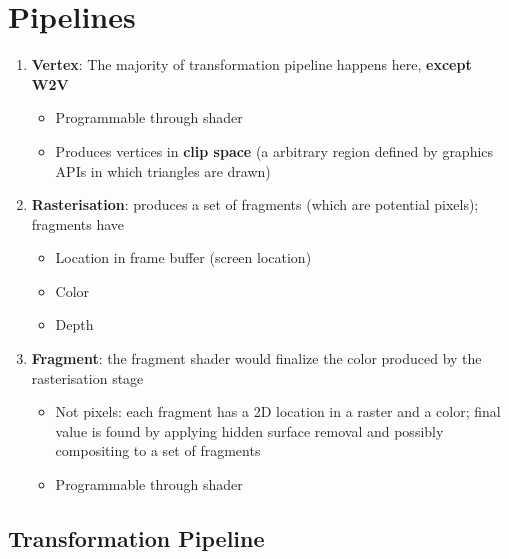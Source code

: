 \chapter{Pipelines}\label{chapter: pipelines}

\begin{enumerate}
  \item \textbf{Vertex}: The majority of transformation pipeline happens here,
  \textbf{except W2V}
  \begin{itemize}
    \item Programmable through shader
    \item Produces vertices in \textbf{clip space} (a arbitrary region defined
    by graphics APIs in which triangles are drawn)
  \end{itemize}

  \item \textbf{Rasterisation}: produces a set of fragments (which are
  potential pixels); fragments have
  \begin{itemize}
    \item Location in frame buffer (screen location)
    \item Color
    \item Depth
  \end{itemize}

  \item \textbf{Fragment}: the fragment shader would finalize the color
  produced by the rasterisation stage
  \begin{itemize}
    \item Not pixels: each fragment has a 2D location in a raster and a color;
    final value is found by applying hidden surface removal and possibly
    compositing to a set of fragments
    \item Programmable through shader
  \end{itemize}
\end{enumerate}

\section{Transformation Pipeline}

